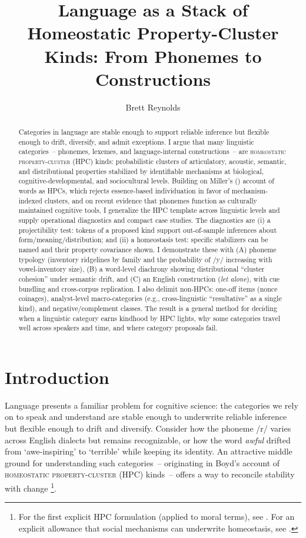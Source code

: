 \documentclass[12pt]{article}
\title{Language as a Stack of Homeostatic Property-Cluster Kinds: From Phonemes to Constructions}
\author{Brett Reynolds}
\date{}
\begin{document}
\maketitle
\doublespacing

\begin{abstract}
\noindent Categories in language are stable enough to support reliable inference but flexible enough to drift, diversify, and admit exceptions. I argue that many linguistic categories~-- phonemes, lexemes, and language-internal constructions~-- are \textsc{homeostatic property-cluster} (HPC) kinds: probabilistic clusters of articulatory, acoustic, semantic, and distributional properties stabilized by identifiable mechanisms at biological, cognitive-developmental, and sociocultural levels. Building on Miller's (\citeyear{Miller2021WordsSpeciesKinds}) account of words as HPCs, which rejects essence-based individuation in favor of mechanism-indexed clusters, and on recent evidence that phonemes function as culturally maintained cognitive tools, I generalize the HPC template across linguistic levels and supply operational diagnostics and compact case studies. The diagnostics are (i) a projectibility test: tokens of a proposed kind support out-of-sample inferences about form/meaning/distribution; and (ii) a homeostasis test: specific stabilizers can be named and their property covariance shown. I demonstrate these with (A) phoneme typology (inventory ridgelines by family and the probability of /y/ increasing with vowel-inventory size), (B) a word-level diachrony showing distributional ``cluster cohesion'' under semantic drift, and (C) an English construction (\textit{let alone}), with cue bundling and cross-corpus replication. I also delimit non-HPCs: one-off items (nonce coinages), analyst-level macro-categories (e.g., cross-linguistic ``resultative'' as a single kind), and negative/complement classes. The result is a general method for deciding when a linguistic category earns kindhood by HPC lights, why some categories travel well across speakers and time, and where category proposals fail.
\end{abstract}

\section{Introduction}
Language presents a familiar problem for cognitive science: the categories we rely on to speak and understand are stable enough to underwrite reliable inference but flexible enough to drift and diversify. Consider how the phoneme /r/ varies across English dialects but remains recognizable, or how the word \textit{awful} drifted from `awe-inspiring' to `terrible' while keeping its identity. An attractive middle ground for understanding such categories~-- originating in Boyd's account of \textsc{homeostatic property-cluster} (HPC) kinds~-- offers a way to reconcile stability with change \citep{Boyd1991Enthusiasm,Boyd1999Homeostasis}\footnote{For the first explicit HPC formulation (applied to moral terms), see \citet[§3.8]{Boyd1988MoralRealist}. For an explicit allowance that social mechanisms can underwrite homeostasis, see \citet{Boyd2000Workmanship}.}.
\end{document}
